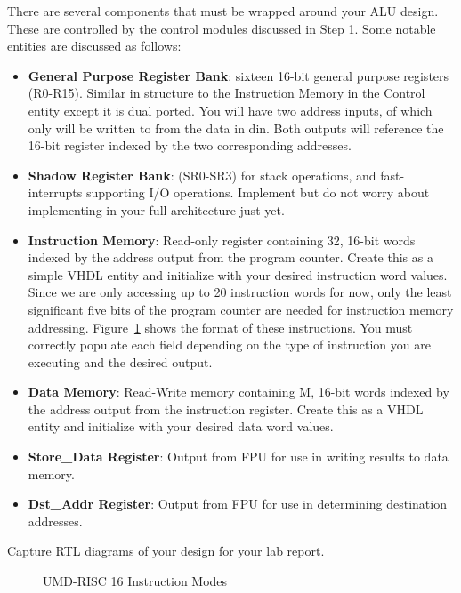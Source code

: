 \documentclass{article}
\begin{document}
\begin{enumerate}
  There are several components that must be wrapped around your ALU design. These are controlled by the control modules discussed in Step 1. Some notable entities are discussed as follows:
  
  \begin{itemize}
    \item \textbf{General Purpose Register Bank}: sixteen 16-bit general purpose registers (R0-R15). Similar in structure to the Instruction Memory in the Control entity except it is dual ported. You will have two address inputs, of which only will be written to from the data in din. Both outputs will reference the 16-bit register indexed by the two corresponding addresses.
    \item \textbf{Shadow Register Bank}: (SR0-SR3) for stack operations, and fast-interrupts supporting I/O operations. Implement but do not worry about implementing in your full architecture just yet.
    \item \textbf{Instruction Memory}: Read-only register containing 32, 16-bit words indexed by the address output from the program counter. Create this as a simple VHDL entity and initialize with your desired instruction word values. Since we are only accessing up to 20 instruction words for now, only the least significant five bits of the program counter are needed for instruction memory addressing. Figure~\ref{fig:instruction_format} shows the format of these instructions. You must correctly populate each field depending on the type of instruction you are executing and the desired output.
    \item \textbf{Data Memory}: Read-Write memory containing M, 16-bit words indexed by the address output from the instruction register. Create this as a VHDL entity and initialize with your desired data word values. 
    \item \textbf{Store\_Data Register}: Output from FPU for use in writing results to data memory.
    \item \textbf{Dst\_Addr Register}: Output from FPU for use in determining destination addresses.
  \end{itemize}
  Capture RTL diagrams of your design for your lab report.
  
  \begin{figure}[htbp]
    \centering
    \caption{UMD-RISC 16 Instruction Modes}
    \label{fig:instruction_format}
  \end{figure}
  \FloatBarrier


\end{enumerate}
\end{document}
